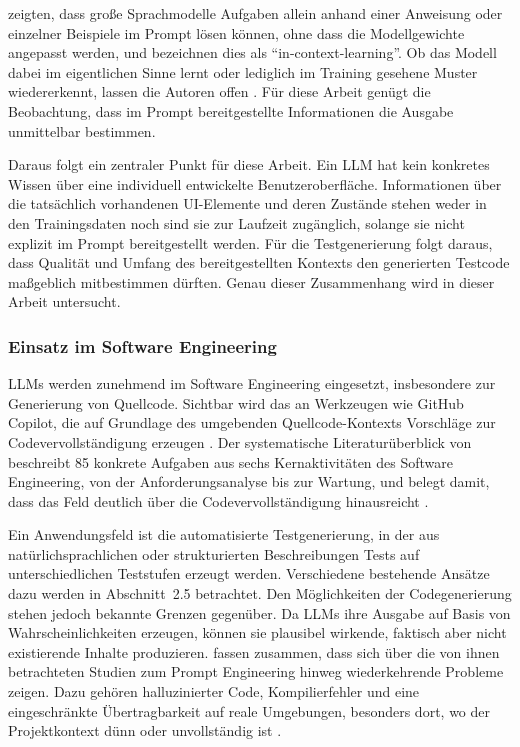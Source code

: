 \textcite[S.~1,~4]{brown_language_2020} zeigten, dass große Sprachmodelle Aufgaben allein anhand einer Anweisung oder einzelner Beispiele im Prompt lösen können, ohne dass die Modellgewichte angepasst werden, und bezeichnen dies als \enquote{in-context-learning}. Ob das Modell dabei im eigentlichen Sinne lernt oder lediglich im Training gesehene Muster wiedererkennt, lassen die Autoren offen \parencite[S.~34]{brown_language_2020}. Für diese Arbeit genügt die Beobachtung, dass im Prompt bereitgestellte Informationen die Ausgabe unmittelbar bestimmen.

Daraus folgt ein zentraler Punkt für diese Arbeit. Ein LLM hat kein konkretes Wissen über eine individuell entwickelte Benutzeroberfläche. Informationen über die tatsächlich vorhandenen \ac{UI}-Elemente und deren Zustände stehen weder in den Trainingsdaten noch sind sie zur Laufzeit zugänglich, solange sie nicht explizit im Prompt bereitgestellt werden. Für die Testgenerierung folgt daraus, dass Qualität und Umfang des bereitgestellten Kontexts den generierten Testcode maßgeblich mitbestimmen dürften. Genau dieser Zusammenhang wird in dieser Arbeit untersucht.

\subsubsection{Einsatz im Software Engineering}

\acp{LLM} werden zunehmend im Software Engineering eingesetzt, insbesondere zur Generierung von Quellcode. Sichtbar wird das an Werkzeugen wie GitHub Copilot, die auf Grundlage des umgebenden Quellcode-Kontexts Vorschläge zur Codevervollständigung erzeugen \parencite[S.~1,~30]{hou_large_2024}. Der systematische Literaturüberblick von \textcite{hou_large_2024} beschreibt 85 konkrete Aufgaben aus sechs Kernaktivitäten des Software Engineering, von der Anforderungsanalyse bis zur Wartung, und belegt damit, dass das Feld deutlich über die Codevervollständigung hinausreicht \parencite[S.~4]{hou_large_2024}.

Ein Anwendungsfeld ist die automatisierte Testgenerierung, in der aus natürlichsprachlichen oder strukturierten Beschreibungen Tests auf unterschiedlichen Teststufen erzeugt werden. Verschiedene bestehende Ansätze dazu werden in Abschnitt~2.5 betrachtet. Den Möglichkeiten der Codegenerierung stehen jedoch bekannte Grenzen gegenüber. Da \acp{LLM} ihre Ausgabe auf Basis von Wahrscheinlichkeiten erzeugen, können sie plausibel wirkende, faktisch aber nicht existierende Inhalte produzieren. \textcite{celik_review_2025} fassen zusammen, dass sich über die von ihnen betrachteten Studien zum Prompt Engineering hinweg wiederkehrende Probleme zeigen. Dazu gehören halluzinierter Code, Kompilierfehler und eine eingeschränkte Übertragbarkeit auf reale Umgebungen, besonders dort, wo der Projektkontext dünn oder unvollständig ist \parencite[S.~10]{celik_review_2025}.


